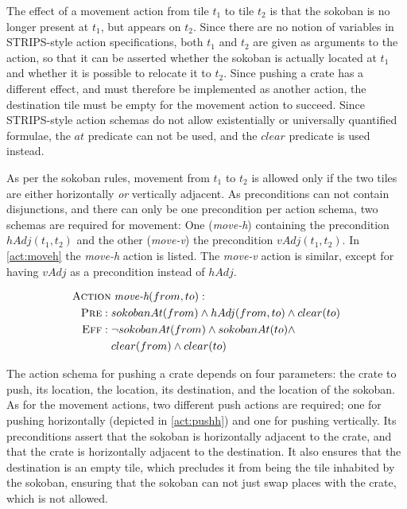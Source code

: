\documentclass[../Master.tex]{subfiles}
\begin{document}
The effect of a movement action from tile $t_1$ to tile $t_2$ is that the sokoban is no longer present at $t_1$, but appears on $t_2$. Since there are no notion of variables in STRIPS-style action specifications, both $t_1$ and $t_2$ are given as arguments to the action, so that it can be asserted whether the sokoban is actually located at $t_1$ and whether it is possible to relocate it to $t_2$. Since pushing a crate has a different effect, and must therefore be implemented as another action, the destination tile must be empty for the movement action to succeed. Since STRIPS-style action schemas do not allow existentially or universally quantified formulae, the $at$ predicate can not be used, and the $clear$ predicate is used instead.

As per the sokoban rules, movement from $t_1$ to $t_2$ is allowed only if the two tiles are either horizontally \textit{or} vertically adjacent. As preconditions can not contain disjunctions, and there can only be one precondition per action schema, two schemas are required for movement: One (\textit{move-h}) containing the precondition $hAdj(t_1,t_2)$ and the other (\textit{move-v}) the precondition $vAdj(t_1, t_2)$.
In \eqref{act:moveh} the \textit{move-h} action is listed. The \textit{move-v} action is similar, except for having $vAdj$ as a precondition instead of $hAdj$.

\begin{align}
\begin{split} \label{act:moveh}
    \textsc{Action} &\; \textit{move-h}(from, to): \\
    \textsc{Pre}: \; & sokobanAt(from) \land hAdj(from, to) \land clear(to) \\
    \textsc{Eff}: \; & \neg sokobanAt(from) \land sokobanAt(to) \land \\
                     & clear(from) \land clear(to)
\end{split}
\end{align}

The action schema for pushing a crate depends on four parameters: the crate to push, its location, the location, its destination, and the location of the sokoban. As for the movement actions, two different push actions are required; one for pushing horizontally (depicted in \eqref{act:pushh}) and one for pushing vertically. Its preconditions assert that the sokoban is horizontally adjacent to the crate, and that the crate is horizontally adjacent to the destination. It also ensures that the destination is an empty tile, which precludes it from being the tile inhabited by the sokoban, ensuring that the sokoban can not just swap places with the crate, which is not allowed.
\end{document}
